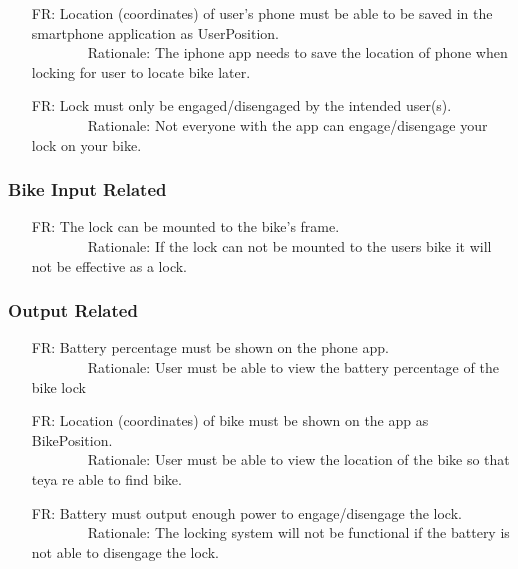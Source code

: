 \documentclass[12pt]{article}
\newcounter{reqnum} %
\newcounter{nfrnum} %
\begin{document}
\begin{itemize}
\item[FR\refstepcounter{reqnum}\thereqnum\label{FR8}:] Location (coordinates) of user’s phone must be able to be saved in the smartphone application as UserPosition.
\\ \-\ \-\ \-\ \-\ \-\ \-\ \-\ \-\ Rationale: The iphone app needs to save the location of phone when locking for user to locate bike later.
\item[FR\refstepcounter{reqnum}\thenfrnum\label{FR9}:] Lock must only be engaged/disengaged by the intended user(s).
\\ \-\ \-\ \-\ \-\ \-\ \-\ \-\ \-\ Rationale: Not everyone with the app can engage/disengage your lock on your bike.
\end{itemize}

\subsubsection{Bike Input Related}
\begin{itemize}
\setlength{\itemindent}{.5in}
\item[FR\refstepcounter{reqnum}\thereqnum\label{FR10}:] The lock can be mounted to the bike's frame.
\\ \-\ \-\ \-\ \-\ \-\ \-\ \-\ \-\ Rationale: If the lock can not be mounted to the users bike it will not be effective as a lock.
\end{itemize}

\subsubsection{Output Related}
\begin{itemize}
\setlength{\itemindent}{.5in}
\item[FR\refstepcounter{reqnum}\thereqnum\label{FR11}:] Battery percentage must be shown on the phone app.
\\ \-\ \-\ \-\ \-\ \-\ \-\ \-\ \-\ Rationale: User must be able to view the battery percentage of the bike lock
\item[FR\refstepcounter{reqnum}\thereqnum\label{FR12}:] Location (coordinates) of bike must be shown on the app as BikePosition.
\\ \-\ \-\ \-\ \-\ \-\ \-\ \-\ \-\ Rationale: User must be able to view the location of the bike so that teya re able to find bike.
\item[FR\refstepcounter{reqnum}\thereqnum\label{FR13}:] Battery must output enough power to engage/disengage the lock.
\\ \-\ \-\ \-\ \-\ \-\ \-\ \-\ \-\ Rationale: The locking system will not be functional if the battery is not able to disengage the lock.
\end{itemize}
\end{document}

